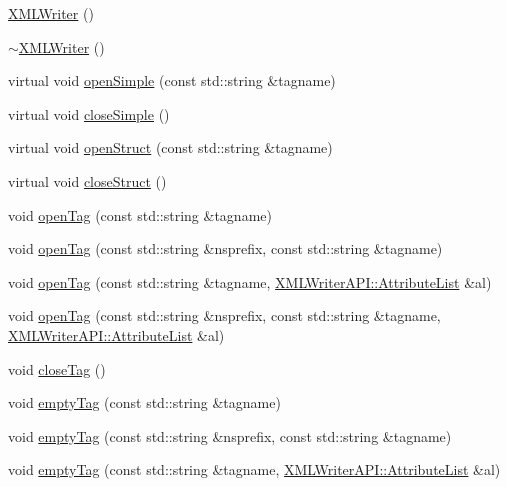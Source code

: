 \begin{DoxyCompactItemize}
\item 
\mbox{\hyperlink{classADATXML_1_1XMLWriter_a42bd3e53ee25d35a1034938e1ad6912b}{X\+M\+L\+Writer}} ()
\item 
\mbox{\hyperlink{classADATXML_1_1XMLWriter_aaeb06e39b2a325fb8f33de0dc1fe66c2}{$\sim$\+X\+M\+L\+Writer}} ()
\item 
virtual void \mbox{\hyperlink{classADATXML_1_1XMLWriter_a5599aaa358e07c8c7a4b7a137ec3e43a}{open\+Simple}} (const std\+::string \&tagname)
\item 
virtual void \mbox{\hyperlink{classADATXML_1_1XMLWriter_a7141f35d34f4d15bbaf15d9124a4e054}{close\+Simple}} ()
\item 
virtual void \mbox{\hyperlink{classADATXML_1_1XMLWriter_a8f9728743acfd9c15ab5d69bf8800a5e}{open\+Struct}} (const std\+::string \&tagname)
\item 
virtual void \mbox{\hyperlink{classADATXML_1_1XMLWriter_abef3ef70df40a5e9e71c99c56f133589}{close\+Struct}} ()
\item 
void \mbox{\hyperlink{classADATXML_1_1XMLWriter_a75da06c5e515ccd9d519501915f50a8f}{open\+Tag}} (const std\+::string \&tagname)
\item 
void \mbox{\hyperlink{classADATXML_1_1XMLWriter_aa65d48238c4b08ebcedd534501e7cbaa}{open\+Tag}} (const std\+::string \&nsprefix, const std\+::string \&tagname)
\item 
void \mbox{\hyperlink{classADATXML_1_1XMLWriter_a0d90742225631452502c6716ee737fef}{open\+Tag}} (const std\+::string \&tagname, \mbox{\hyperlink{namespaceXMLWriterAPI_a28cf3d8051a4ccf0aef208b7ebc66d07}{X\+M\+L\+Writer\+A\+P\+I\+::\+Attribute\+List}} \&al)
\item 
void \mbox{\hyperlink{classADATXML_1_1XMLWriter_a26795936be9ebee12c374fa82065ffb5}{open\+Tag}} (const std\+::string \&nsprefix, const std\+::string \&tagname, \mbox{\hyperlink{namespaceXMLWriterAPI_a28cf3d8051a4ccf0aef208b7ebc66d07}{X\+M\+L\+Writer\+A\+P\+I\+::\+Attribute\+List}} \&al)
\item 
void \mbox{\hyperlink{classADATXML_1_1XMLWriter_a13209ef7863272707bf8fea7c172e9f1}{close\+Tag}} ()
\item 
void \mbox{\hyperlink{classADATXML_1_1XMLWriter_a7749a56b9e15992d3168f808b2ad02c5}{empty\+Tag}} (const std\+::string \&tagname)
\item 
void \mbox{\hyperlink{classADATXML_1_1XMLWriter_a7941500f8d733594745588b65ff4789c}{empty\+Tag}} (const std\+::string \&nsprefix, const std\+::string \&tagname)
\item 
void \mbox{\hyperlink{classADATXML_1_1XMLWriter_a48c5adaca1b1c8126047c410c86644f3}{empty\+Tag}} (const std\+::string \&tagname, \mbox{\hyperlink{namespaceXMLWriterAPI_a28cf3d8051a4ccf0aef208b7ebc66d07}{X\+M\+L\+Writer\+A\+P\+I\+::\+Attribute\+List}} \&al)

\end{DoxyCompactItemize}
